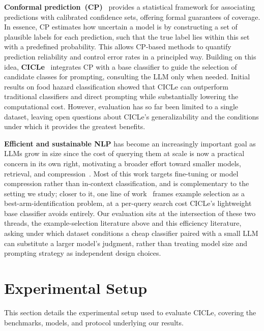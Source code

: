 \documentclass[runningheads]{llncs}
\begin{document}
\textbf{Conformal prediction~(CP)}~\cite{vovk2005algorithmic} provides a
statistical framework for associating predictions with calibrated
confidence sets, offering formal guarantees of coverage. In essence, CP
estimates how uncertain a model is by constructing a set of plausible
labels for each prediction, such that the true label lies within this
set with a predefined probability. This allows CP-based methods to
quantify prediction reliability and control error rates in a principled
way. Building on this idea, \textbf{CICLe}~\cite{randl2024cicle} integrates CP with a base classifier to guide the selection of candidate classes for prompting, consulting the LLM only when needed. Initial results on food hazard classification
showed that CICLe can outperform traditional classifiers and direct
prompting while substantially lowering the computational cost. However,
evaluation has so far been limited to a single dataset, leaving open
questions about CICLe's generalizability and the conditions under which
it provides the greatest benefits.

\textbf{Efficient and sustainable NLP} has become an increasingly
important goal as LLMs grow in size since the cost of querying them at
scale is now a practical concern in its own right, motivating a broader
effort toward smaller models, retrieval, and
compression~\cite{henderson2020towards,schick2021s,strubell2019energy}.
Most of this work targets fine-tuning or model compression rather than
in-context classification, and is complementary to the setting we
study; closer to it, one line of
work~\cite{purohit2025sampleefficientdemonstrationselection} frames
example selection as a best-arm-identification problem, at a
per-query search cost CICLe's lightweight base classifier avoids
entirely. Our evaluation sits at the intersection of these two threads,
the example-selection literature above and this efficiency
literature, asking under which dataset conditions a cheap classifier
paired with a small LLM can substitute a larger model's judgment,
rather than treating model size and prompting strategy as independent
design choices.
%
\section{Experimental Setup}
\label{sec:exp-setup}
%
This section details the experimental setup used to evaluate CICLe,
covering the benchmarks, models, and protocol underlying our results.
%
\end{document}

